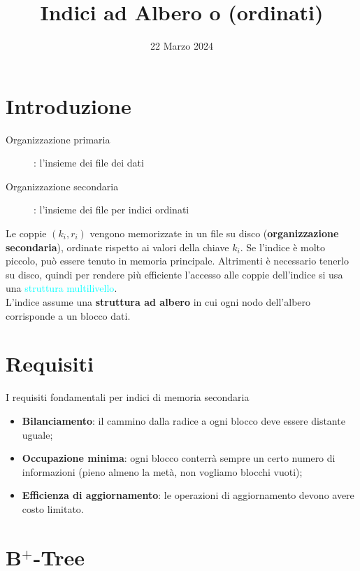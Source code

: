 \documentclass[12pt]{article}
\title{Indici ad Albero o (ordinati)}
\date{22 Marzo 2024}
\begin{document}
\maketitle
\section{Introduzione}
\begin{description}
    \item[Organizzazione primaria]: l'insieme dei file dei dati
    \item[Organizzazione secondaria]: l'insieme dei file per indici ordinati 
\end{description}
Le coppie $(k_{i},r_{i})$ vengono memorizzate in un file su disco (\textbf{organizzazione secondaria}), ordinate rispetto ai valori della chiave $k_{i}$. Se l'indice è molto piccolo, può essere tenuto in memoria principale. Altrimenti è necessario tenerlo su disco, quindi per rendere più efficiente l'accesso alle coppie dell'indice si usa una \textcolor{Cyan}{struttura multilivello}.\\
L'indice assume una \textbf{struttura ad albero} in cui ogni nodo dell'albero corrisponde a un blocco dati.
\section{Requisiti}
I requisiti fondamentali per indici di memoria secondaria
\begin{itemize}
    \item \textbf{Bilanciamento}: il cammino dalla radice a ogni blocco deve essere distante uguale;
    \item \textbf{Occupazione minima}: ogni blocco conterrà sempre un certo numero di informazioni (pieno almeno la metà, non vogliamo blocchi vuoti);
    \item \textbf{Efficienza di aggiornamento}: le operazioni di aggiornamento devono avere costo limitato.
\end{itemize}\newpage
\section{B$^{+}$-Tree}
\end{document}
